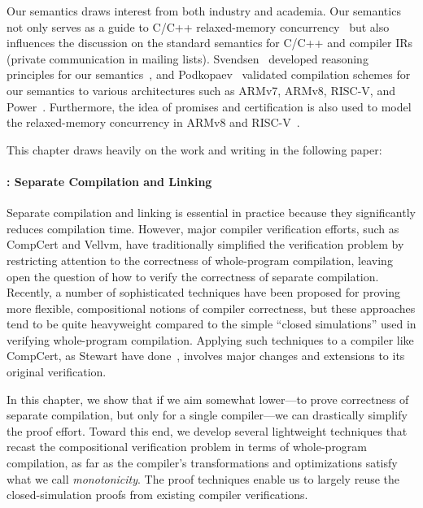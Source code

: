 Our semantics draws interest from both industry and academia.  Our semantics not only serves as a
guide to C/C++ relaxed-memory concurrency~\cite{kang-synch-patterns,niko-promising-semantics} but
also influences the discussion on the standard semantics for C/C++ and compiler IRs (private
communication in mailing lists).  Svendsen~\etal{} developed reasoning principles for our
semantics~\cite{promising-logic}, and Podkopaev~\etal{} validated compilation schemes for our
semantics to various architectures such as ARMv7, ARMv8, RISC-V, and Power~\cite{imm-compilation}.
Furthermore, the idea of promises and certification is also used to model the relaxed-memory
concurrency in ARMv8 and RISC-V~\cite{promising-armv8-riscv}.

This chapter draws heavily on the work and writing in the following paper:



\paragraph{: Separate Compilation and Linking}

Separate compilation and linking is essential in practice because they significantly reduces
compilation time.  However, major compiler verification efforts, such as CompCert and Vellvm, have
traditionally simplified the verification problem by restricting attention to the correctness of
whole-program compilation, leaving open the question of how to verify the correctness of separate
compilation.  Recently, a number of sophisticated techniques have been proposed for proving more
flexible, compositional notions of compiler correctness, but these approaches tend to be quite
heavyweight compared to the simple ``closed simulations'' used in verifying whole-program
compilation.  Applying such techniques to a compiler like CompCert, as Stewart \etal{} have
done~\cite{stewart+:popl2015}, involves major changes and extensions to its original verification.

In this chapter, we show that if we aim somewhat lower---to prove correctness of separate
compilation, but only for a single compiler---we can drastically simplify the proof effort.  Toward
this end, we develop several lightweight techniques that recast the compositional verification
problem in terms of whole-program compilation, as far as the compiler's transformations and
optimizations satisfy what we call \emph{monotonicity}.  The proof techniques enable us to largely
reuse the closed-simulation proofs from existing compiler verifications.

